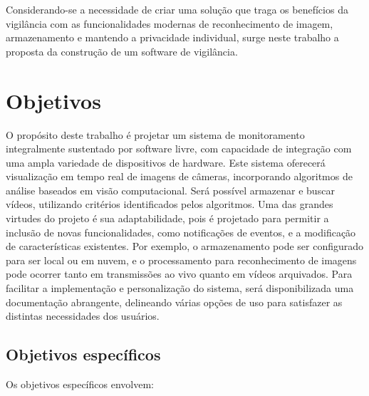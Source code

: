 \documentclass[12pt, %
openright, 
oneside, %
a4paper,    %
brazil]{facom-ufu-abntex2}
\begin{document}
Considerando-se a necessidade de criar uma solução que traga os benefícios da
vigilância com as funcionalidades modernas de reconhecimento de imagem,
armazenamento e mantendo a privacidade individual, surge neste trabalho a
proposta da construção de um software de vigilância.

\section{Objetivos}

O propósito deste trabalho é projetar um sistema de monitoramento integralmente
sustentado por software livre, com capacidade de integração com uma ampla
variedade de dispositivos de hardware. Este sistema oferecerá visualização em
tempo real de imagens de câmeras, incorporando algoritmos de análise baseados
em visão computacional. Será possível armazenar e buscar vídeos, utilizando
critérios identificados pelos algoritmos. Uma das grandes virtudes do projeto é
sua adaptabilidade, pois é projetado para permitir a inclusão de novas
funcionalidades, como notificações de eventos, e a modificação de
características existentes. Por exemplo, o armazenamento pode ser configurado
para ser local ou em nuvem, e o processamento para reconhecimento de imagens
pode ocorrer tanto em transmissões ao vivo quanto em vídeos arquivados. Para
facilitar a implementação e personalização do sistema, será disponibilizada uma
documentação abrangente, delineando várias opções de uso para satisfazer as
distintas necessidades dos usuários.

\subsection{Objetivos específicos}

Os objetivos específicos envolvem:
\end{document}
